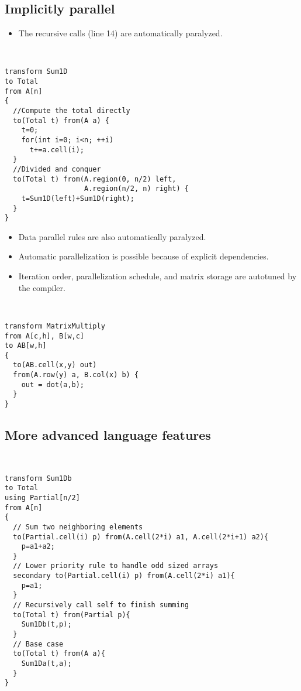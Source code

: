 \documentclass{beamer}
\begin{document}
\subsection{Implicitly parallel}
\begin{frame}[fragile]
\begin{itemize}
\item The recursive calls (line 14) are automatically paralyzed.
\end{itemize}
~~\begin{minipage}{.8\linewidth}\footnotesize
\begin{lstlisting}
transform Sum1D 
to Total
from A[n]
{
  //Compute the total directly 
  to(Total t) from(A a) {
    t=0;
    for(int i=0; i<n; ++i)
      t+=a.cell(i); 
  }
  //Divided and conquer
  to(Total t) from(A.region(0, n/2) left,
                   A.region(n/2, n) right) {
    t=Sum1D(left)+Sum1D(right);
  }
}
\end{lstlisting}
\end{minipage}
\end{frame}

\begin{frame}[fragile]
\begin{itemize}
\item Data parallel rules are also automatically paralyzed.
\item Automatic parallelization is possible because of explicit dependencies.
\item Iteration order, parallelization schedule, and matrix storage are
autotuned by the compiler.
\end{itemize}
~~\begin{minipage}{.8\linewidth}\footnotesize
\begin{lstlisting}
transform MatrixMultiply
from A[c,h], B[w,c] 
to AB[w,h]
{
  to(AB.cell(x,y) out) 
  from(A.row(y) a, B.col(x) b) {
    out = dot(a,b);
  }
}
\end{lstlisting}
\end{minipage}
\end{frame}

\subsection{More advanced language features}
\begin{frame}[fragile]
~~\begin{minipage}{.8\linewidth}\scriptsize
\begin{lstlisting}
transform Sum1Db
to Total
using Partial[n/2]
from A[n]
{
  // Sum two neighboring elements
  to(Partial.cell(i) p) from(A.cell(2*i) a1, A.cell(2*i+1) a2){
    p=a1+a2;
  }
  // Lower priority rule to handle odd sized arrays
  secondary to(Partial.cell(i) p) from(A.cell(2*i) a1){
    p=a1;
  }
  // Recursively call self to finish summing
  to(Total t) from(Partial p){
    Sum1Db(t,p);
  }
  // Base case
  to(Total t) from(A a){
    Sum1Da(t,a);
  }
}
\end{lstlisting}
\end{minipage}
\end{frame}
\end{document}
